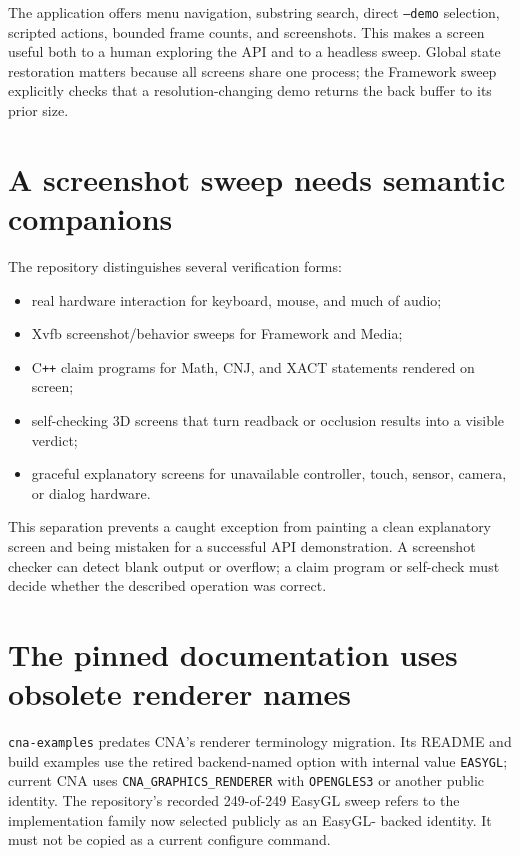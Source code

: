 The application offers menu navigation, substring search, direct \texttt{--demo} selection,
scripted actions, bounded frame counts, and screenshots.  This makes a screen useful both to a
human exploring the API and to a headless sweep.  Global state restoration matters because all
screens share one process; the Framework sweep explicitly checks that a resolution-changing demo
returns the back buffer to its prior size.

\section{A screenshot sweep needs semantic companions}

The repository distinguishes several verification forms:

\begin{itemize}
  \item real hardware interaction for keyboard, mouse, and much of audio;
  \item Xvfb screenshot/behavior sweeps for Framework and Media;
  \item C\texttt{++} claim programs for Math, CNJ, and XACT statements rendered on screen;
  \item self-checking 3D screens that turn readback or occlusion results into a visible verdict;
  \item graceful explanatory screens for unavailable controller, touch, sensor, camera, or dialog
        hardware.
\end{itemize}

This separation prevents a caught exception from painting a clean explanatory screen and being
mistaken for a successful API demonstration.  A screenshot checker can detect blank output or
overflow; a claim program or self-check must decide whether the described operation was correct.

\section{The pinned documentation uses obsolete renderer names}

\texttt{cna-examples} predates CNA's renderer terminology migration.  Its README and build
examples use the retired backend-named option with internal value \texttt{EASYGL}; current CNA
uses \texttt{CNA\_GRAPHICS\_RENDERER} with \texttt{OPENGLES3} or another public identity.  The repository's recorded
249-of-249 EasyGL sweep refers to the implementation family now selected publicly as an EasyGL-
backed identity.  It must not be copied as a current configure command.


